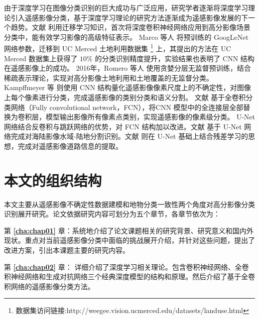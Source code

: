 由于深度学习在图像分类识别的巨大成功与广泛应用，研究学者逐渐将深度学习理论引入遥感影像分类，基于深度学习理论的研究方法逐渐成为遥感影像发展的下一个趋势。文献 \cite{hu2015transferring} 利用迁移学习知识，首次将深度卷积神经网络应用到高分影像场景分类中，能有效学习影像的高级特征表示。 Marco 等人 \cite{castelluccio2015land} 将预训练的 GoogLeNet 网络参数，迁移到 UC Merced 土地利用数据集 \footnote{数据集访问链接:http://weegee.vision.ucmerced.edu/datasets/landuse.html} 上，其提出的方法在 UC Merced 数据集上获得了 $10\%$ 的分类识别精度提升，实验结果也表明了 CNN 结构在遥感影像上的成功。 2016年，Romero 等人 \cite{romero2016unsupervised} 使用贪婪分层无监督预训练，结合稀疏表示理论，实现对高分影像土地利用和土地覆盖的无监督分类。 Kampffmeyer 等 \cite{kampffmeyer2016semantic} 则使用 CNN 结构量化遥感影像像素尺度上的不确定性，对图像上每个像素进行分类，完成遥感影像的类别分类和语义分割。 文献 \cite{maggiori2016fully} 基于全卷积分类网络（Fully convolutional network，FCN），将CNN 模型中的全连接层全部替换为卷积层，模型输出影像所有像素点类别，实现遥感影像的像素级分类。 U-Net \cite{ronneberger2015u} 网络结合反卷积与跳跃网络的优势，对 FCN 结构加以改进。文献 \cite{li2018deepunet} 基于 U-Net 网络完成对海陆影像水域-陆地分割识别。文献 \cite{zhang2018road} 则在 U-Net 基础上结合残差学习的思想，完成对遥感影像道路信息的提取。



\section{本文的组织结构}
\label{sec:third}
本文主要从遥感影像不确定性数据建模和地物分类一致性两个角度对高分影像分类识别展开研究。论文依据研究内容可划分为五个章节，各章节依次为：

第 \textbf{\ref{cha:chap01}} 章：系统地介绍了论文课题相关的研究背景、研究意义和国内外现状。重点对当前遥感影像分类中面临的挑战展开介绍，并针对这些问题，提出了改进方案，引出本课题主要的研究内容。

第 \textbf{\ref{cha:chap02}} 章： 详细介绍了深度学习相关理论。包含卷积神经网络、全卷积神经网络和生成对抗网络三个经典深度模型的结构和原理。然后介绍了基于全卷积网络的遥感影像分类方法。

